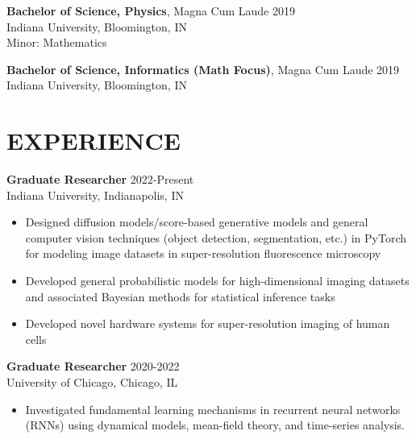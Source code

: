 \documentclass[margin, 10pt]{res} %
\begin{document}
\begin{resume}
\textbf{Bachelor of Science, Physics}, Magna Cum Laude \hfill 2019\\
Indiana University, Bloomington, IN\\
Minor: Mathematics 

\textbf{Bachelor of Science, Informatics (Math Focus)}, Magna Cum Laude \hfill 2019\\
Indiana University, Bloomington, IN\\


 
\section{EXPERIENCE}

\textbf{Graduate Researcher} \hfill 2022-Present \\
Indiana University, Indianapolis, IN

\begin{itemize} \itemsep -2pt %

\item Designed diffusion models/score-based generative models and general computer vision techniques (object detection, segmentation, etc.) in PyTorch for modeling image datasets in super-resolution fluorescence microscopy

\item Developed general probabilistic models for high-dimensional imaging datasets and associated Bayesian methods for statistical inference tasks

\item Developed novel hardware systems for super-resolution imaging of human cells 

\end{itemize}

\textbf{Graduate Researcher} \hfill 2020-2022 \\
University of Chicago, Chicago, IL

\begin{itemize} \itemsep -2pt %

\item Investigated fundamental learning mechanisms in recurrent neural networks (RNNs) using dynamical models, mean-field theory, and time-series analysis. 


\end{itemize}
\end{resume}
\end{document}
